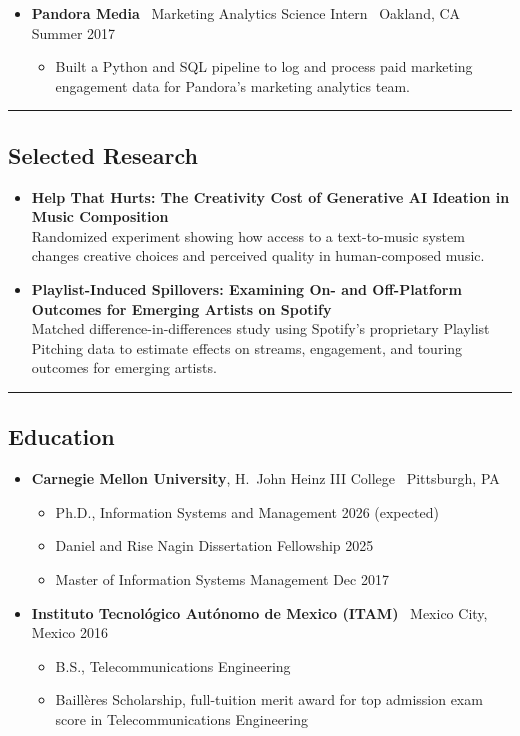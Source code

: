 \documentclass[10pt,letterpaper]{article}
\newcommand{\sep}{{\color{gray}\,\textbullet\,\,}}
\newcommand{\hsep}{\noindent\textcolor{gray}{\rule{\textwidth}{0.5pt}}}
\newcommand{\block}[1]{\begin{samepage}\hsep\subsection*{#1}\end{samepage}}
\begin{document}
\begin{itemize}[leftmargin=0pt, label={}]
\begin{itemize}
  \item Maintained KPI tracking, dashboards, and MAU reporting and forecasting workflows; used Hive and Airflow to support recurring targeting datasets and Tableau to monitor campaign performance.
  \end{itemize}
\item \textbf{Pandora Media} \sep Marketing Analytics Science Intern \sep Oakland, CA \hfill Summer 2017
  \begin{itemize}
  \item Built a Python and SQL pipeline to log and process paid marketing engagement data for Pandora's marketing analytics team.
  \end{itemize}
\end{itemize}

\block{Selected Research}

\begin{itemize}[leftmargin=0pt, label={}]
\item \textbf{Help That Hurts: The Creativity Cost of Generative AI Ideation in Music Composition} \\
Randomized experiment showing how access to a text-to-music system changes creative choices and perceived quality in human-composed music.
\item \textbf{Playlist-Induced Spillovers: Examining On- and Off-Platform Outcomes for Emerging Artists on Spotify} \\
Matched difference-in-differences study using Spotify's proprietary Playlist Pitching data to estimate effects on streams, engagement, and touring outcomes for emerging artists.
\end{itemize}

\block{Education}

\begin{itemize}[leftmargin=0pt, label={}]
\item \textbf{Carnegie Mellon University}, H.\ John Heinz III College \sep Pittsburgh, PA
  \begin{itemize}[label={}]
  \item Ph.D., Information Systems and Management \hfill 2026 (expected)
  \item Daniel and Rise Nagin Dissertation Fellowship \hfill 2025
  \item Master of Information Systems Management \hfill Dec 2017
  \end{itemize}
\item \textbf{Instituto Tecnol\'ogico Aut\'onomo de Mexico (ITAM)} \sep Mexico City, Mexico \hfill 2016
  \begin{itemize}[label={}]
  \item B.S., Telecommunications Engineering
  \item Baill\`eres Scholarship, full-tuition merit award for top admission exam score in Telecommunications Engineering
  \end{itemize}
\end{itemize}
\end{document}
